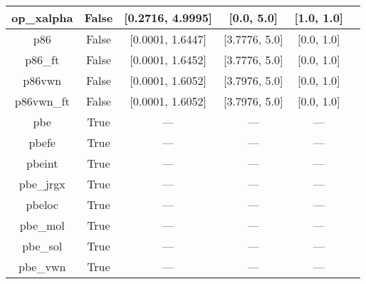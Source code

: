 \begin{tabular}{|c|c|c|c|c|l|}
    op\_xalpha &                 False & [0.2716, 4.9995] &       [0.0, 5.0] &     [1.0, 1.0] &                      \cite{Tsuneda1999_10664,Tsuneda1999_5656} \\ \hline
           p86 &                 False & [0.0001, 1.6447] &    [3.7776, 5.0] &     [0.0, 1.0] &                                         \cite{Perdew1986_8822} \\ \hline
       p86\_ft &                 False & [0.0001, 1.6452] &    [3.7776, 5.0] &     [0.0, 1.0] &                                         \cite{Perdew1986_8822} \\ \hline
        p86vwn &                 False & [0.0001, 1.6052] &    [3.7976, 5.0] &     [0.0, 1.0] &                                         \cite{Perdew1986_8822} \\ \hline
    p86vwn\_ft &                 False & [0.0001, 1.6052] &    [3.7976, 5.0] &     [0.0, 1.0] &                                         \cite{Perdew1986_8822} \\ \hline
           pbe &                  True &              --- &              --- &            --- &                     \cite{Perdew1996_3865,Perdew1996_3865_err} \\ \hline
         pbefe &                  True &              --- &              --- &            --- &                                          \cite{Perez2015_3844} \\ \hline
        pbeint &                  True &              --- &              --- &            --- &                                      \cite{Fabiano2010_113104} \\ \hline
     pbe\_jrgx &                  True &              --- &              --- &            --- &                                      \cite{Pedroza2009_201106} \\ \hline
        pbeloc &                  True &              --- &              --- &            --- &                                   \cite{Constantin2012_035130} \\ \hline
      pbe\_mol &                  True &              --- &              --- &            --- &                                     \cite{delCampo2012_104108} \\ \hline
      pbe\_sol &                  True &              --- &              --- &            --- &                                       \cite{Perdew2008_136406} \\ \hline
      pbe\_vwn &                  True &              --- &              --- &            --- & \cite{Kraisler2010_042516,Perdew1996_3865,Perdew1996_3865_err} \\ \hline

\end{tabular}

